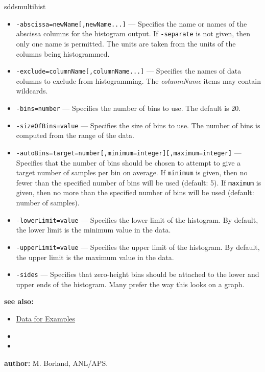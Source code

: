 \begin{sddsprog}{sddsmultihist}
\begin{itemize}
      \item \verb|-abscissa=newName[,newName...]| --- Specifies the name or names of the abscissa columns for the histogram
        output. If \verb|-separate| is not given, then only one name is permitted. The units are taken from the units of the
        columns being histogrammed.
      \item \verb|-exclude=columnName[,columnName...]| --- Specifies the names of data columns to exclude from histogramming. The
        \emph{columnName} items may contain wildcards.
      \item \verb|-bins=number| --- Specifies the number of bins to use. The default is 20.
      \item \verb|-sizeOfBins=value| --- Specifies the size of bins to use. The number of bins is computed from the range of the
        data.
      \item \verb|-autoBins=target=number[,minimum=integer][,maximum=integer]| --- Specifies that the number of bins should be
        chosen to attempt to give a target number of samples per bin on average. If \verb|minimum| is given, then no fewer than
        the specified number of bins will be used (default: 5). If \verb|maximum| is given, then no more than the specified number
        of bins will be used (default: number of samples).
      \item \verb|-lowerLimit=value| --- Specifies the lower limit of the histogram. By default, the lower limit is the minimum
        value in the data.
      \item \verb|-upperLimit=value| --- Specifies the upper limit of the histogram. By default, the upper limit is the maximum
        value in the data.
      \item \verb|-sides| --- Specifies that zero-height bins should be attached to the lower and upper ends of the histogram.
        Many prefer the way this looks on a graph.
    \end{itemize}
  \item \textbf{see also:}
    \begin{itemize}
      \item \hyperref[exampleData]{Data for Examples}
      \item {}
      \item {}
    \end{itemize}
  \item \textbf{author:} M. Borland, ANL/APS.
\end{sddsprog}

